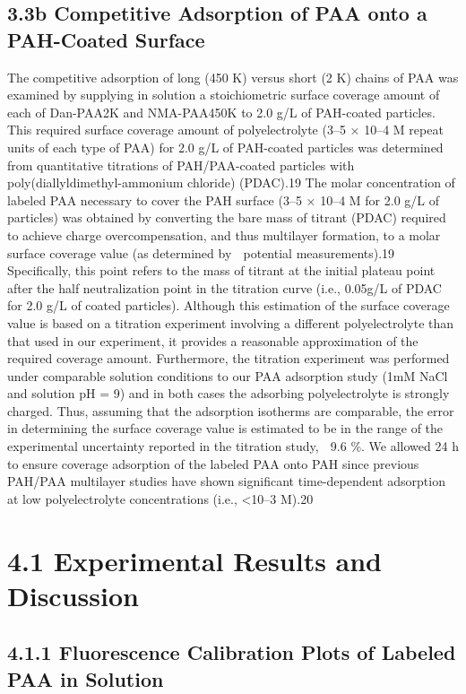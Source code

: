 \documentclass[journal=jacsat,manuscript=article]{achemso}
\begin{document}
\subsection{3.3b Competitive Adsorption of PAA onto a PAH-Coated Surface}

The competitive adsorption of long (450 K) versus short (2 K) chains of PAA was examined by supplying in solution a stoichiometric surface coverage amount of each of Dan-PAA2K and NMA-PAA450K to 2.0 g/L of PAH-coated particles.  This required surface coverage amount of polyelectrolyte (3–5 × 10–4 M repeat units of each type of PAA) for 2.0 g/L of PAH-coated particles was determined from quantitative titrations of PAH/PAA-coated particles with poly(diallyldimethyl-ammonium chloride) (PDAC).19  The molar concentration of labeled PAA necessary to cover the PAH surface (3–5 × 10–4 M for 2.0 g/L of particles) was obtained by converting the bare mass of titrant (PDAC) required to achieve charge overcompensation, and thus multilayer formation, to a molar surface coverage value (as determined by  potential measurements).19  Specifically, this point refers to the mass of titrant at the initial plateau point after the half neutralization point in the titration curve (i.e., 0.05g/L of PDAC for 2.0 g/L of coated particles).  Although this estimation of the surface coverage value is based on a titration experiment involving a different polyelectrolyte than that used in our experiment, it provides a reasonable approximation of the required coverage amount.  Furthermore, the titration experiment was performed under comparable solution conditions to our PAA adsorption study (1mM NaCl and solution pH = 9) and in both cases the adsorbing polyelectrolyte is strongly charged.  Thus, assuming that the adsorption isotherms are comparable, the error in determining the surface coverage value is estimated to be in the range of the experimental uncertainty reported in the titration study,  9.6 \%.  We allowed 24 h to ensure coverage adsorption of the labeled PAA onto PAH since previous PAH/PAA multilayer studies have shown significant time-dependent adsorption at low polyelectrolyte concentrations (i.e., <10–3 M).20

\section{4.1 Experimental Results and Discussion}

\subsection{4.1.1 Fluorescence Calibration Plots of Labeled PAA in Solution}
\end{document}
